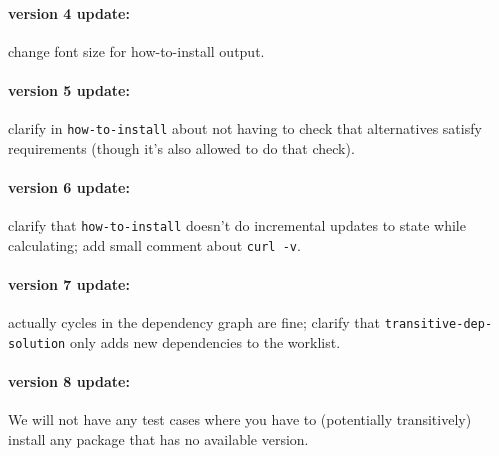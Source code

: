 \documentclass[12pt]{article}
\renewcommand{\_}{\kern-1.5pt\textunderscore\kern-1.5pt}
\begin{document}
\paragraph{version 4 update:} change font size for how-to-install output.

\paragraph{version 5 update:} clarify in \texttt{how-to-install} about not having to check that alternatives satisfy requirements (though it's also allowed to do that check).

\paragraph{version 6 update:} clarify that \texttt{how-to-install} doesn't do incremental updates to state while calculating; add small comment about \verb+curl -v+.

\paragraph{version 7 update:} actually cycles in the dependency graph are fine; clarify that \texttt{transitive-dep-solution} only adds new dependencies to the worklist.

\paragraph{version 8 update:} We will not have any test cases where you have to (potentially transitively) install any package that has no available version.
\end{document}
